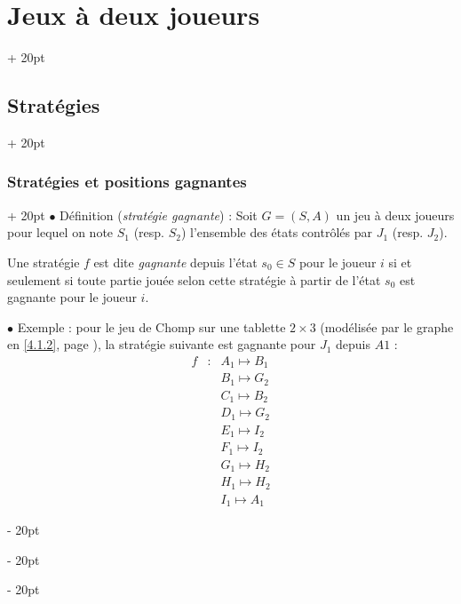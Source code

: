 \documentclass[a4paper, 12pt, twoside]{article}
\newcommand{\ind}[1][20pt]{\advance\leftskip + #1}
\newcommand{\deind}[1][20pt]{\advance\leftskip - #1}
\newenvironment{indt}[2][20pt]{#2 \par \ind[#1]}{\par \deind} %
\begin{document}
\begin{indt}{\section{Jeux à deux joueurs}}
\begin{indt}{\subsection{Stratégies}}
            \vspace{12pt}
            
            \begin{indt}{\subsubsection{Stratégies et positions gagnantes}}
                $\bullet$ Définition (\emph{stratégie gagnante}) : Soit $G = (S, A)$ un jeu à deux joueurs pour lequel on note $S_1$ (resp. $S_2$) l'ensemble des états contrôlés par $J_1$ (resp. $J_2$).

                Une stratégie $f$ est dite \emph{gagnante} depuis l'état $s_0 \in S$ pour le joueur $i$ si et seulement si toute partie jouée selon cette stratégie à partir de l'état $s_0$ est gagnante pour le joueur $i$.

                \vspace{12pt}
                
                $\bullet$ Exemple : pour le jeu de Chomp sur une tablette $2 \times 3$ (modélisée par le graphe en \ref{4.1.2}, page \pageref{4.1.2}), la stratégie suivante est gagnante pour $J_1$ depuis $A1$ :
                \[
                    \begin{array}{rcl}
                        f
                        & : & A_1 \longmapsto B_1
                        \\
                        && B_1 \longmapsto G_2
                        \\
                        && C_1 \longmapsto B_2
                        \\
                        && D_1 \longmapsto G_2
                        \\
                        && E_1 \longmapsto I_2
                        \\
                        && F_1 \longmapsto I_2
                        \\
                        && G_1 \longmapsto H_2
                        \\
                        && H_1 \longmapsto H_2
                        \\
                        && I_1 \longmapsto A_1
                    \end{array}
                \]


\end{indt}
\end{indt}
\end{indt}
\end{document}
